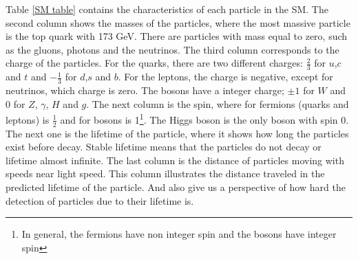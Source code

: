 
Table \ref{SM table} contains the characteristics of each particle in the SM. The second column shows the masses of the particles, where the most massive particle is the top quark with 173 GeV. There are particles with mass equal to zero, such as the gluons, photons and the neutrinos. 
The third column corresponds to the charge of the particles. For the quarks, there are two different charges: $\frac{2}{3}$ for $u$,$c$ and $t$ and $-\frac{1}{3}$ for $d$,$s$ and $b$. For the leptons, the charge is negative, except for neutrinos, which charge is zero. 
The bosons have a integer charge; $\pm 1$ for $W$ and 0 for $Z$, $\gamma$, $H$ and $g$.	
The next column is the spin, where for fermions (quarks and leptons) is $\frac{1}{2}$ and for bosons is 1\footnote{In general, the fermions have non integer spin and the bosons have integer spin}. The Higgs boson is the only boson with spin 0.
The next one is the lifetime of the particle, where it shows how long the particles exist before decay. Stable lifetime means that the particles do not decay or lifetime almost infinite.
The last column is the distance of particles moving with speeds near light speed. This column illustrates the distance traveled in the predicted lifetime of the particle. And also give us a perspective of how hard the detection of  particles due to their lifetime is.  

